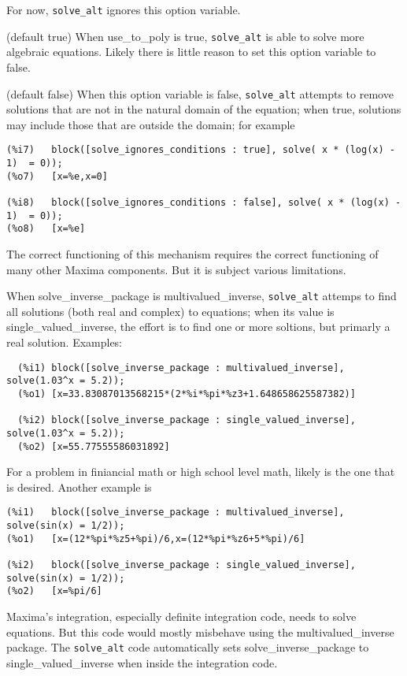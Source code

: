 \documentclass[]{scrartcl}
\newcommand{\altsolve}{\texttt{solve\_alt}}
\begin{document}
\begin{description}
For now, \altsolve \/ ignores this option variable.

\item [use\_to\_poly] (default true)  When use\_to\_poly is true, \altsolve\/ is able to solve more algebraic equations.  Likely there is little reason to set this option variable to false.

\item[solve\_ignores\_conditions] (default false) When this option variable is false, \altsolve\/ attempts to remove solutions that are not in the natural domain of the equation; when true, solutions may include those that are outside the domain; for example
\begin{verbatim}
(%i7)	block([solve_ignores_conditions : true], solve( x * (log(x) - 1)  = 0));
(%o7)	[x=%e,x=0]

(%i8)	block([solve_ignores_conditions : false], solve( x * (log(x) - 1)  = 0));
(%o8)	[x=%e]
\end{verbatim}

The correct functioning of this mechanism requires the correct functioning of many other Maxima components. But it is subject various limitations.

\item[solve\_inverse\_package] When solve\_inverse\_package is multivalued\_inverse, \altsolve\/ attemps to find all solutions (both real and complex) to equations; when its value is single\_valued\_inverse, the effort is to find one or more soltions, but primarly a real solution. Examples:
\begin{verbatim}
  (%i1)	block([solve_inverse_package : multivalued_inverse], solve(1.03^x = 5.2));
  (%o1)	[x=33.83087013568215*(2*%i*%pi*%z3+1.648658625587382)]

  (%i2)	block([solve_inverse_package : single_valued_inverse], solve(1.03^x = 5.2));
  (%o2)	[x=55.77555586031892]
\end{verbatim}
For a problem in finiancial math or high school level math, likely is the one that is desired. Another
example is
\begin{verbatim}
(%i1)	block([solve_inverse_package : multivalued_inverse], solve(sin(x) = 1/2));
(%o1)	[x=(12*%pi*%z5+%pi)/6,x=(12*%pi*%z6+5*%pi)/6]

(%i2)	block([solve_inverse_package : single_valued_inverse], solve(sin(x) = 1/2));
(%o2)	[x=%pi/6]
\end{verbatim}

Maxima's integration, especially definite integration code, needs to solve equations. But this code would mostly misbehave using the  multivalued\_inverse package. The \altsolve\/ code automatically sets solve\_inverse\_package to single\_valued\_inverse when inside the integration code.

\end{description}
\end{document}
